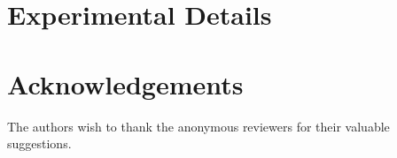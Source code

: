 \documentclass[]{IEEEphot}
\begin{document}
\section{Experimental Details}

\section*{Acknowledgements}
The authors wish to thank the anonymous reviewers for their valuable suggestions.  



\end{document}
